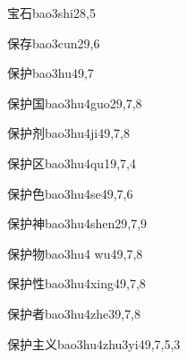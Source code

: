 \begin{entry}{宝石}{bao3shi2}{8,5}
\end{entry}

\begin{entry}{保存}{bao3cun2}{9,6}
\end{entry}

\begin{entry}{保护}{bao3hu4}{9,7}
\end{entry}

\begin{entry}{保护国}{bao3hu4guo2}{9,7,8}
\end{entry}

\begin{entry}{保护剂}{bao3hu4ji4}{9,7,8}
\end{entry}

\begin{entry}{保护区}{bao3hu4qu1}{9,7,4}
\end{entry}

\begin{entry}{保护色}{bao3hu4se4}{9,7,6}
\end{entry}

\begin{entry}{保护神}{bao3hu4shen2}{9,7,9}
\end{entry}

\begin{entry}{保护物}{bao3hu4 wu4}{9,7,8}
\end{entry}

\begin{entry}{保护性}{bao3hu4xing4}{9,7,8}
\end{entry}

\begin{entry}{保护者}{bao3hu4zhe3}{9,7,8}
\end{entry}

\begin{entry}{保护主义}{bao3hu4zhu3yi4}{9,7,5,3}
\end{entry}

